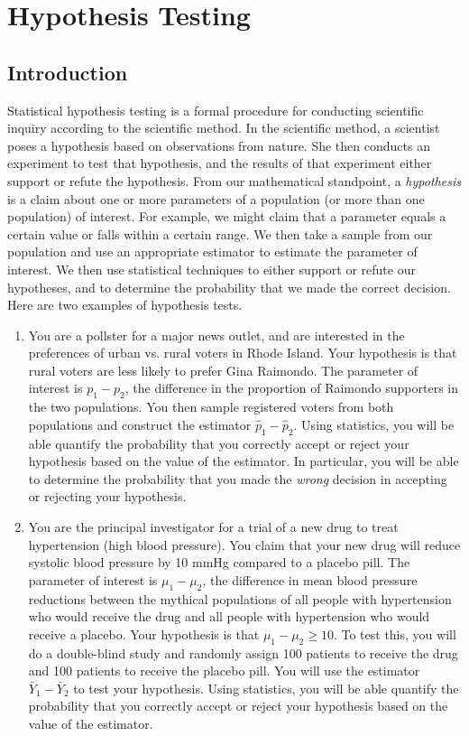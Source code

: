 \documentclass[12pt]{article}
\theoremstyle{definition}
\theoremstyle{remark}
\begin{document}
\setcounter{section}{6}
\section{Hypothesis Testing}

\subsection{Introduction}
Statistical hypothesis testing is a formal procedure for conducting scientific inquiry according to the scientific method. In the scientific method, a scientist poses a hypothesis based on observations from nature. She then conducts an experiment to test that hypothesis, and the results of that experiment either support or refute the hypothesis. From our mathematical standpoint, a \emph{hypothesis} is a claim about one or more parameters of a population (or more than one population) of interest. For example, we might claim that a parameter equals a certain value or falls within a certain range. We then take a sample from our population and use an appropriate estimator to estimate the parameter of interest. We then use statistical techniques to either support or refute our hypotheses, and to determine the probability that we made the correct decision. \\

Here are two examples of hypothesis tests.
\begin{enumerate}
\item You are a pollster for a major news outlet, and are interested in the preferences of urban vs. rural voters in Rhode Island. Your hypothesis is that rural voters are less likely to prefer Gina Raimondo. The parameter of interest is $p_1 - p_2$, the difference in the proportion of Raimondo supporters in the two populations. You then sample registered voters from both populations and construct the estimator $\hat{p}_1 - \hat{p}_2$. Using statistics, you will be able quantify the probability that you correctly accept or reject your hypothesis based on the value of the estimator. In particular, you will be able to determine the probability that you made the \emph{wrong} decision in accepting or rejecting your hypothesis.

\item You are the principal investigator for a trial of a new drug to treat hypertension (high blood pressure). You claim that your new drug will reduce systolic blood pressure by 10 mmHg compared to a placebo pill. The parameter of interest is $\mu_1 - \mu_2$, the difference in mean blood pressure reductions between the mythical populations of all people with hypertension who would receive the drug and all people with hypertension who would receive a placebo. Your hypothesis is that $\mu_1 - \mu_2 \geq 10$. To test this, you will do a double-blind study and randomly assign 100 patients to receive the drug and 100 patients to receive the placebo pill. You will use the estimator $\bar{Y}_1 - \bar{Y}_2$ to test your hypothesis. Using statistics, you will be able quantify the probability that you correctly accept or reject your hypothesis based on the value of the estimator.
\end{enumerate}
\end{document}
